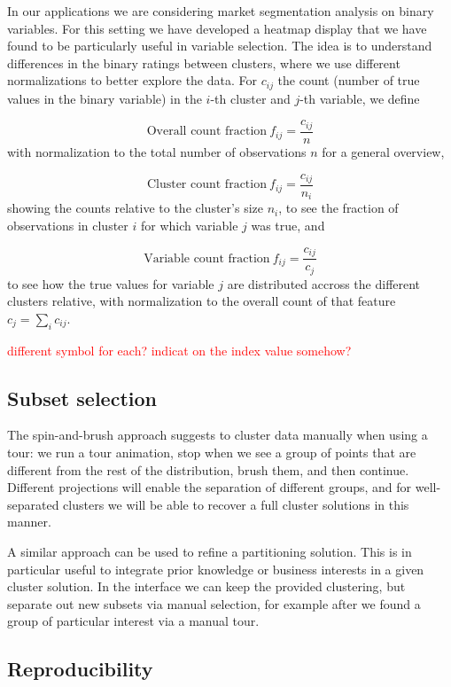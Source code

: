 \documentclass[article]{ajs}
\begin{document}
In our applications we are considering market segmentation analysis on binary variables. For this setting we have developed a heatmap display that we have found to be particularly useful in variable selection. The idea is to understand differences in the binary ratings between clusters, where we use different normalizations to better explore the data. For \(c_{ij}\) the count (number of true values in the binary variable) in the \(i\)-th cluster and \(j\)-th variable, we define


\[
\text{Overall count fraction}\ f_{ij} = \frac{c_{ij}}{n}
\]
with normalization to the total number of observations $n$ for a general overview,

\[
\text{Cluster count fraction}\  f_{ij} = \frac{c_{ij}}{n_{i}}
\]
showing the counts relative to the cluster's size \(n_i\), to see the fraction of observations in cluster $i$ for which variable $j$ was true, and


\[
\text{Variable count fraction}\ f_{ij} = \frac{c_{ij}}{c_{j}}
\]
to see how the true values for variable $j$ are distributed accross the different clusters relative, with normalization to the overall count of that feature \(c_j = \sum_i c_{ij}\).
 
\textcolor{red}{different symbol for each? indicat on the index value somehow?}

\subsection{Subset selection}

The spin-and-brush approach suggests to cluster data manually when using a tour: we run a tour animation, stop when we see a group of points that are different from the rest of the distribution, brush them, and then continue. Different projections will enable the separation of different groups, and for well-separated clusters we will be able to recover a full cluster solutions in this manner.

A similar approach can be used to refine a partitioning solution. This is in particular useful to integrate prior knowledge or business interests in a given cluster solution. In the interface we can keep the provided clustering, but separate out new subsets via manual selection, for example after we found a group of particular interest via a manual tour.

\subsection{Reproducibility}
\end{document}
